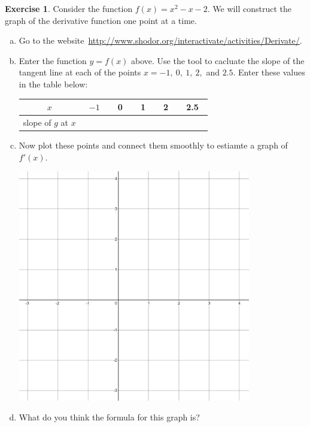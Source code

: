 \documentclass[11pt,reqno,final]{amsart}
\numberwithin{figure}{section}
\theoremstyle{definition} %
\newtheorem{exercise}[question]{Exercise}
\begin{document}
\begin{exercise}
        Consider the function $f(x) = x^2-x-2$.
        We will construct the graph of the derivative function one point at a time.
        \begin{enumerate}[(a)]
        \item Go to the website\  \url{http://www.shodor.org/interactivate/activities/Derivate/}.
        \item Enter the function $y = f(x)$ above. Use the tool to cacluate the slope of the tangent line at each of the points
                $x = -1,\ 0,\ 1,\ 2,$ and $2.5$.
                Enter these values in the table below:
                \begin{table}[hp]
                        \centering
                        \begin{tabular}{c||c|c|c|c|c}
                          $x$ & \ $-1$\ &\  0\ &\ 1\ &\ 2\ &\ 2.5\ \\ \hline
                          slope of $g$ at $x$ &&&&
                        \end{tabular}
                \end{table}
        \item Now plot these points and connect them smoothly to estiamte a graph of $f'(x)$.
                \begin{center}
                        \includegraphics[width=4in]{10-09P_axes.png}
                \end{center}
        \item What do you think the formula for this graph is?
        \end{enumerate}
\end{exercise}
\end{document}

